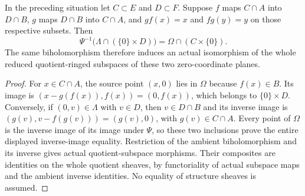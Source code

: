 \begin{lemma}
\label{hir:actual-stable-ambient-subset-iso}
\leanok
In the preceding situation let $C\subset E$ and $D\subset F$. Suppose $f$ maps $C\cap A$ into $D\cap B$, $g$ maps $D\cap B$ into $C\cap A$, and $gf(x)=x$ and $fg(y)=y$ on those respective subsets. Then
\[
 \Psi^{-1}\bigl(\Lambda\cap(\{0\}\times D)\bigr)
   =\Omega\cap(C\times\{0\}).
\]
The same biholomorphism therefore induces an actual isomorphism of the whole reduced quotient-ringed subspaces of these two zero-coordinate planes.
\end{lemma}
\begin{proof}
For $x\in C\cap A$, the source point $(x,0)$ lies in $\Omega$ because $f(x)\in B$. Its image is $(x-g(f(x)),f(x))=(0,f(x))$, which belongs to $\{0\}\times D$. Conversely, if $(0,v)\in\Lambda$ with $v\in D$, then $v\in D\cap B$ and its inverse image is $(g(v),v-f(g(v)))=(g(v),0)$, with $g(v)\in C\cap A$. Every point of $\Omega$ is the inverse image of its image under $\Psi$, so these two inclusions prove the entire displayed inverse-image equality. Restriction of the ambient biholomorphism and its inverse gives actual quotient-subspace morphisms. Their composites are identities on the whole quotient sheaves, by functoriality of actual subspace maps and the ambient inverse identities. No equality of structure sheaves is assumed.
\end{proof}

